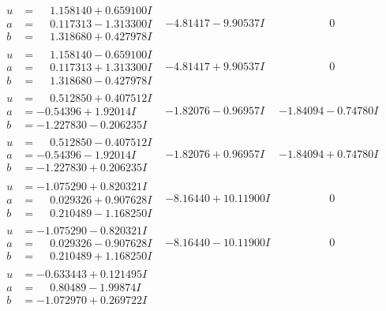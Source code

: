 \documentclass[1p]{elsarticle_modified}
\theoremstyle{definition}
\begin{document}
$$\begin{array}{c|c|c}
\begin{aligned}
u &= \phantom{-}1.158140 + 0.659100 I \\
a &= \phantom{-}0.117313 - 1.313300 I \\
b &= \phantom{-}1.318680 + 0.427978 I\end{aligned}
 & -4.81417 - 9.90537 I & \phantom{-0.000000 } 0 \\ \hline\begin{aligned}
u &= \phantom{-}1.158140 - 0.659100 I \\
a &= \phantom{-}0.117313 + 1.313300 I \\
b &= \phantom{-}1.318680 - 0.427978 I\end{aligned}
 & -4.81417 + 9.90537 I & \phantom{-0.000000 } 0 \\ \hline\begin{aligned}
u &= \phantom{-}0.512850 + 0.407512 I \\
a &= -0.54396 + 1.92014 I \\
b &= -1.227830 - 0.206235 I\end{aligned}
 & -1.82076 - 0.96957 I & -1.84094 - 0.74780 I \\ \hline\begin{aligned}
u &= \phantom{-}0.512850 - 0.407512 I \\
a &= -0.54396 - 1.92014 I \\
b &= -1.227830 + 0.206235 I\end{aligned}
 & -1.82076 + 0.96957 I & -1.84094 + 0.74780 I \\ \hline\begin{aligned}
u &= -1.075290 + 0.820321 I \\
a &= \phantom{-}0.029326 + 0.907628 I \\
b &= \phantom{-}0.210489 - 1.168250 I\end{aligned}
 & -8.16440 + 10.11900 I & \phantom{-0.000000 } 0 \\ \hline\begin{aligned}
u &= -1.075290 - 0.820321 I \\
a &= \phantom{-}0.029326 - 0.907628 I \\
b &= \phantom{-}0.210489 + 1.168250 I\end{aligned}
 & -8.16440 - 10.11900 I & \phantom{-0.000000 } 0 \\ \hline\begin{aligned}
u &= -0.633443 + 0.121495 I \\
a &= \phantom{-}0.80489 - 1.99874 I \\
b &= -1.072970 + 0.269722 I\end{aligned}

\end{array}$$
\end{document}
